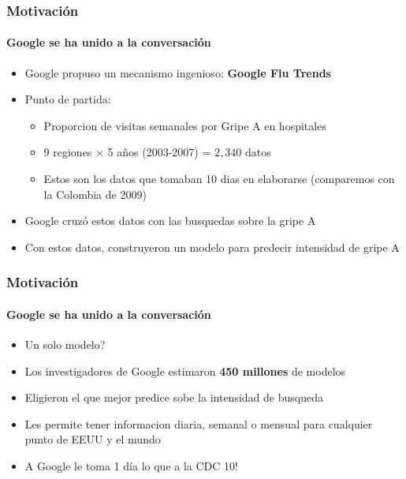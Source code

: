 \documentclass[
  shownotes,
  xcolor={svgnames},
  hyperref={colorlinks,citecolor=DarkBlue,linkcolor=DarkRed,urlcolor=DarkBlue}
  , aspectratio=169]{beamer}
\begin{document}

\begin{frame}
\frametitle{Motivación}
\framesubtitle{Google se ha unido a la conversación}

\begin{itemize}
  \item Google propuso un mecanismo ingenioso: {\bf Google Flu Trends}
  \bigskip
  \item Punto de partida: 
  \begin{itemize}
    \item Proporcion de visitas semanales por Gripe A en hospitales 
    \item 9 regiones $\times$ 5 años (2003-2007) = $2,340$ datos
    \item Estos son los datos que tomaban 10 dias en elaborarse (comparemos con la Colombia de 2009)
  \end{itemize}
  \bigskip
  \item Google cruzó estos datos con las busquedas sobre la gripe A
  \bigskip
  \item Con estos datos, construyeron un modelo para predecir intensidad de gripe A  
\end{itemize}  

\end{frame}


\begin{frame}
\frametitle{Motivación}
\framesubtitle{Google se ha unido a la conversación}

\begin{itemize}
  \item Un solo modelo?
  \bigskip
  \item Los investigadores de Google estimaron {\bf 450 millones} de modelos
  \bigskip
  \item Eligieron el que mejor predice sobe la intensidad de busqueda
  \bigskip
  \item Les permite tener informacion diaria, semanal o mensual para cualquier punto de EEUU y el mundo
  \bigskip
  \item A Google le toma 1 día lo que a la CDC 10!
\end{itemize}  
\end{frame}



\end{document}
